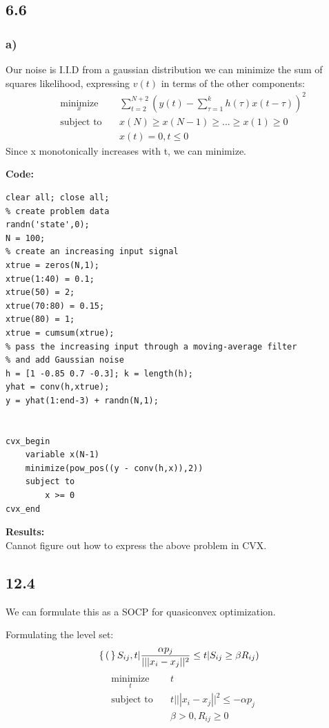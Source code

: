 \documentclass[12pt]{article}
\begin{document}
\subsection*{6.6}
\subsubsection*{a)}
Our noise is I.I.D from a gaussian distribution we can minimize the sum of squares likelihood, expressing $v(t)$ in terms of the other components:
\begin{equation*}
\begin{aligned}
& \underset{x}{\text{minimize}}
& & \sum_{t=2}^{N+2}(y(t)-\sum_{\tau=1}^{k}h(\tau)x(t-\tau))^2\\
& \text{subject to}\
& & x(N) \ge x(N-1) \ge ... \ge x(1) \ge 0\\
& & & x(t) = 0, t \le 0
\end{aligned}
\end{equation*}
Since x monotonically increases with t, we can minimize.

\textbf{Code:}
\begin{lstlisting}
clear all; close all;
% create problem data
randn('state',0);
N = 100;
% create an increasing input signal
xtrue = zeros(N,1);
xtrue(1:40) = 0.1;
xtrue(50) = 2;
xtrue(70:80) = 0.15;
xtrue(80) = 1;
xtrue = cumsum(xtrue);
% pass the increasing input through a moving-average filter
% and add Gaussian noise
h = [1 -0.85 0.7 -0.3]; k = length(h);
yhat = conv(h,xtrue);
y = yhat(1:end-3) + randn(N,1);


cvx_begin
    variable x(N-1)
    minimize(pow_pos((y - conv(h,x)),2))
    subject to
        x >= 0
cvx_end
\end{lstlisting}
\textbf{Results:}\\
Cannot figure out how to express the above problem in CVX.

\subsection*{12.4}

We can formulate this as a SOCP for quasiconvex optimization.

Formulating the level set:
$$\set(S_{ij},t | \frac{\alpha p_j}{|||x_i-x_j||^2} \le t | S_{ij} \ge \beta R_{ij} )$$
\begin{equation*}
\begin{aligned}
& \underset{t}{\text{minimize}}
& & t\\
& \text{subject to}\
& &  t|||x_i-x_j||^2 \le -\alpha p_j \\
& & & \beta > 0, R_{ij} \ge 0
\end{aligned}
\end{equation*} 
\end{document}
